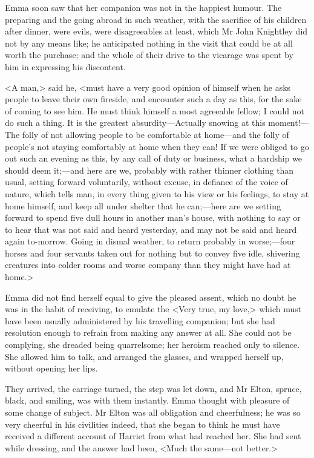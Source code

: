 Emma soon saw that her companion was not in the happiest humour. The preparing and the going abroad in such weather, with the sacrifice of his children after dinner, were evils, were disagreeables at least, which Mr John Knightley did not by any means like; he anticipated nothing in the visit that could be at all worth the purchase; and the whole of their drive to the vicarage was spent by him in expressing his discontent.

<A man,> said he, <must have a very good opinion of himself when he asks people to leave their own fireside, and encounter such a day as this, for the sake of coming to see him. He must think himself a most agreeable fellow; I could not do such a thing. It is the greatest absurdity—Actually snowing at this moment!—The folly of not allowing people to be comfortable at home—and the folly of people's not staying comfortably at home when they can! If we were obliged to go out such an evening as this, by any call of duty or business, what a hardship we should deem it;—and here are we, probably with rather thinner clothing than usual, setting forward voluntarily, without excuse, in defiance of the voice of nature, which tells man, in every thing given to his view or his feelings, to stay at home himself, and keep all under shelter that he can;—here are we setting forward to spend five dull hours in another man's house, with nothing to say or to hear that was not said and heard yesterday, and may not be said and heard again to-morrow. Going in dismal weather, to return probably in worse;—four horses and four servants taken out for nothing but to convey five idle, shivering creatures into colder rooms and worse company than they might have had at home.>

Emma did not find herself equal to give the pleased assent, which no doubt he was in the habit of receiving, to emulate the <Very true, my love,> which must have been usually administered by his travelling companion; but she had resolution enough to refrain from making any answer at all. She could not be complying, she dreaded being quarrelsome; her heroism reached only to silence. She allowed him to talk, and arranged the glasses, and wrapped herself up, without opening her lips.

They arrived, the carriage turned, the step was let down, and Mr Elton, spruce, black, and smiling, was with them instantly. Emma thought with pleasure of some change of subject. Mr Elton was all obligation and cheerfulness; he was so very cheerful in his civilities indeed, that she began to think he must have received a different account of Harriet from what had reached her. She had sent while dressing, and the answer had been, <Much the same—not better.>

